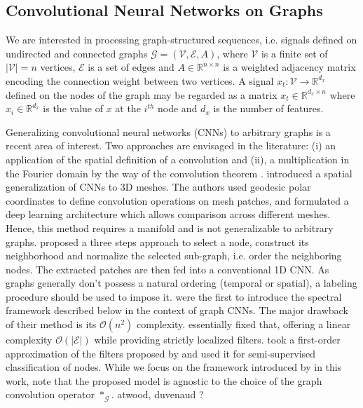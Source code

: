\documentclass{article} %
\newcommand{\R}{\mathbb{R}}
\newcommand{\bO}{\mathcal{O}}
\newcommand{\G}{\mathcal{G}}
\newcommand{\V}{\mathcal{V}}
\newcommand{\E}{\mathcal{E}}
\newcommand{\todo}[1]{{\color{red} #1 }}
\begin{document}

\subsection{Convolutional Neural Networks on Graphs}

We are interested in processing graph-structured sequences, i.e. signals
defined on undirected and connected graphs $\G=(\V,\E,A)$, where $\V$ is a
finite set of $|\V|=n$ vertices, $\E$ is a set of edges and $A \in \R^{n \times
n}$ is a weighted adjacency matrix encoding the connection weight between two
vertices. A signal $x_t: \V \rightarrow \R^{d_x}$ defined on the nodes of the
graph may be regarded as a matrix $x_t \in \R^{d_x \times n}$ where $x_i \in
\R^{d_x}$ is the value of $x$ at the $i^{th}$ node and $d_x$ is the number of
features.

Generalizing convolutional neural networks (CNNs) to arbitrary graphs is a
recent area of interest. Two approaches are envisaged in the literature: (i) an
application of the spatial definition of a convolution \citep{gcnn_masci,
gcnn_niepert} and (ii), a multiplication in the Fourier domain by the way of
the convolution theorem \citep{gcnn_bruna, gcnn}. \citet{gcnn_masci} introduced
a spatial generalization of CNNs to 3D meshes. The authors used geodesic polar
coordinates to define convolution operations on mesh patches, and formulated a
deep learning architecture which allows comparison across different meshes.
Hence, this method requires a manifold and is not generalizable to arbitrary
graphs. \citet{gcnn_niepert} proposed a three steps approach to select a node,
construct its neighborhood and normalize the selected sub-graph, i.e. order the
neighboring nodes. The extracted patches are then fed into a conventional 1D
CNN. As graphs generally don't possess a natural ordering (temporal or
spatial), a labeling procedure should be used to impose it. \citet{gcnn_bruna}
were the first to introduce the spectral framework described below in the
context of graph CNNs. The major drawback of their method is its $\bO(n^2)$
complexity. \citet{gcnn} essentially fixed that, offering a linear complexity
$\bO(|\E|)$ while providing strictly localized filters. \citet{gcnn_kipf} took
a first-order approximation of the filters proposed by \citet{gcnn} and used it
for semi-supervised classification of nodes. While we focus on the framework
introduced by \citet{gcnn} in this work, note that the proposed model is
agnostic to the choice of the graph convolution operator $\ast_\G$.
\todo{atwood, duvenaud ?}
\end{document}
